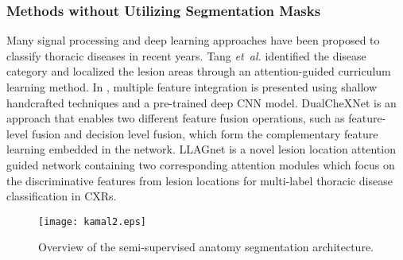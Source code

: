 \documentclass[journal]{IEEEtran}
\newcommand{\etal}{\emph{et~al.}}
\begin{document}
\subsubsection{Methods without Utilizing Segmentation Masks}
\label{classification_literature}
Many signal processing and deep learning approaches have been proposed to classify thoracic diseases in recent years. Tang \etal \cite{Tang2018AttentionGuidedCL} identified the disease category and localized the lesion areas through an attention-guided curriculum learning method. In \cite{ho2019multiple}, multiple feature integration is presented using shallow handcrafted techniques and a pre-trained deep CNN model. DualCheXNet \cite{chen2019dualchexnet} is an approach that enables two different feature fusion operations, such as feature-level fusion and decision level fusion, which form the complementary feature learning embedded in the network. LLAGnet \cite{Chen2020LesionLA} is a novel lesion location attention guided network containing two corresponding attention modules which focus on the discriminative features from lesion locations for multi-label thoracic disease classification in CXRs. 
\begin{figure*}[!t]
	\centering
	\texttt{[image: kamal2.eps]}
	\caption{Overview of the semi-supervised anatomy segmentation architecture.}
	\label{cyclegan_archi}
\end{figure*}
\end{document}
